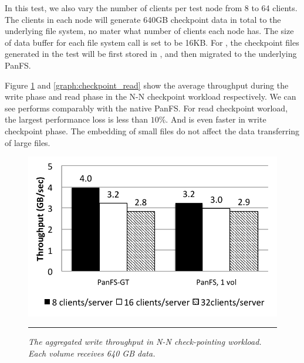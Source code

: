 In this test, we also vary the number of clients per test node
from 8 to 64 clients. The clients in each node will generate
640GB checkpoint data in total to the underlying file system,
no mater what number of clients each node has.
The size of data buffer for each file system call is set to be 16KB.
For \psys, the checkpoint files generated in the test will be
first stored in \tfs, and then migrated to the underlying PanFS.

Figure \ref{graph:checkpoint_write} and \ref{graph:checkpoint_read}
show the average throughput during the write phase and read phase
in the N-N checkpoint workload respectively. We can see \psys
performs comparably with the native PanFS.
For read checkpoint worload, the largest performance loss is less than $10\%$.
And \psys is even faster in write checkpoint phase.
The embedding of small files do not affect the data transferring
of large files.

\begin{figure}[t]  %
\centerline{\includegraphics[scale=0.7]{./figs/checkpointing_write}}
\vspace{10pt}
\caption{\normalsize
\textit{
The aggregated write throughput in N-N check-pointing workload.
Each volume receives 640 GB data.
}
}
\vspace{10pt}
\hrule
\label{graph:checkpoint_write}
\end{figure}       %


